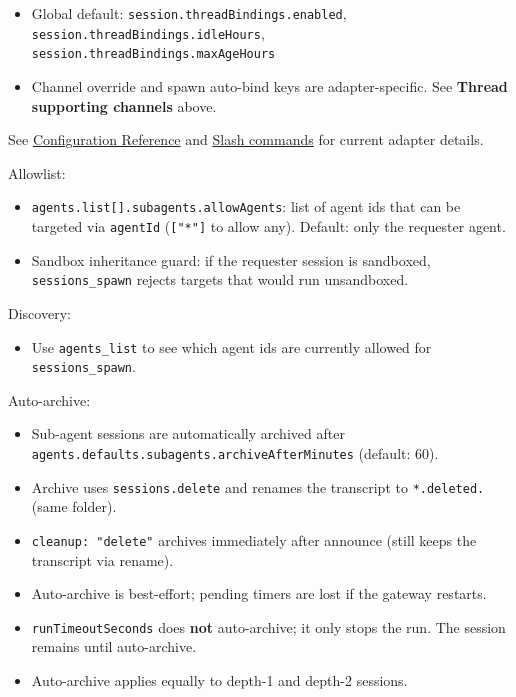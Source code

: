 \begin{itemize}
  \item Global default: \texttt{session.threadBindings.enabled}, \texttt{session.threadBindings.idleHours}, \texttt{session.threadBindings.maxAgeHours}
  \item Channel override and spawn auto-bind keys are adapter-specific. See \textbf{Thread supporting channels} above.
\end{itemize}


See \href{/gateway/configuration-reference}{Configuration Reference} and \href{/tools/slash-commands}{Slash commands} for current adapter details.

Allowlist:

\begin{itemize}
  \item \texttt{agents.list[].subagents.allowAgents}: list of agent ids that can be targeted via \texttt{agentId} (\texttt{["*"]} to allow any). Default: only the requester agent.
  \item Sandbox inheritance guard: if the requester session is sandboxed, \texttt{sessions\_spawn} rejects targets that would run unsandboxed.
\end{itemize}


Discovery:

\begin{itemize}
  \item Use \texttt{agents\_list} to see which agent ids are currently allowed for \texttt{sessions\_spawn}.
\end{itemize}


Auto-archive:

\begin{itemize}
  \item Sub-agent sessions are automatically archived after \texttt{agents.defaults.subagents.archiveAfterMinutes} (default: 60).
  \item Archive uses \texttt{sessions.delete} and renames the transcript to \texttt{*.deleted.} (same folder).
  \item \texttt{cleanup: "delete"} archives immediately after announce (still keeps the transcript via rename).
  \item Auto-archive is best-effort; pending timers are lost if the gateway restarts.
  \item \texttt{runTimeoutSeconds} does \textbf{not} auto-archive; it only stops the run. The session remains until auto-archive.
  \item Auto-archive applies equally to depth-1 and depth-2 sessions.
\end{itemize}


